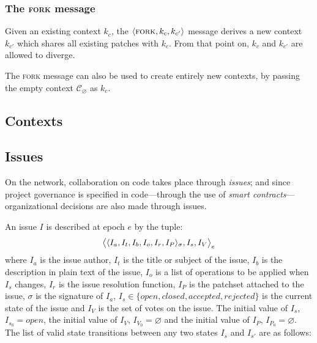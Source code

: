 \subsubsection{The \textsc{fork} message}
\label{fork-op}

Given an existing context $k_c$, the $\langle \text{\normalfont\scshape fork}, k_c, k_{c'} \rangle$ message derives
a new context $k_{c'}$ which shares all existing patches with $k_c$. From that
point on, $k_c$ and $k_{c'}$ are allowed to diverge.

The \textsc{fork} message can also be used to create entirely new contexts, by
passing the empty context $\mathcal{C}_\varnothing$ as $k_c$.

\subsection{Contexts}
\todo{}





\subsection{Issues}
\label{issues}

On the \oscoin{} network, collaboration on code takes place through \emph{issues};
and since project governance is specified in code---through the use of
\emph{smart contracts}---organizational decisions are also made through issues.


An issue $I$ is described at epoch $e$ by the tuple:
\[
    \big<\langle I_a, I_t, I_b, I_o, I_r, I_P \rangle_{\sigma}, I_s, I_V \big>_e
\]
where $I_a$ is the issue author, $I_t$ is the title or subject of the issue,
$I_b$ is the description in plain text of the issue, $I_o$ is a list of
operations to be applied when $I_s$ changes, $I_r$ is the issue resolution
function, $I_P$ is the patchset attached to the issue, $\sigma$ is the
signature of $I_a$, $I_s \in \{open, closed, accepted, rejected\}$ is the
current state of the issue and $I_V$ is the set of votes on the issue. The
initial value of $I_s$, $I_{s_0} = open$, the initial value of $I_V$, $I_{V_0}
= \varnothing$ and the initial value of $I_P$, $I_{P_0} = \varnothing$.  The list
of valid state transitions between any two states $I_s$ and $I_{s'}$ are as
follows:

